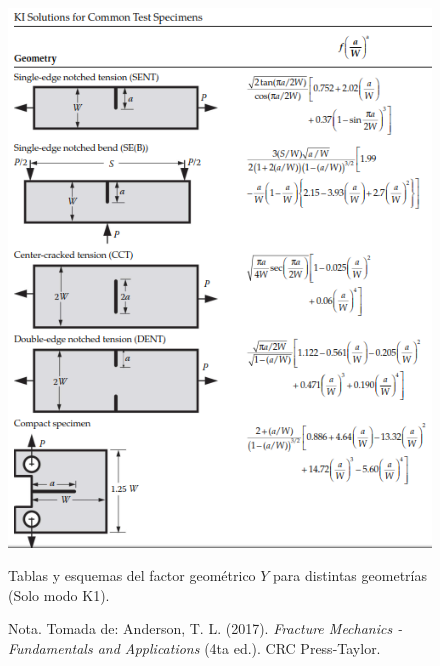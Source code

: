\documentclass[12pt,letterpaper]{article}
\begin{document}
\begin{figure}[H]
    \centering
    \includegraphics[width=0.85\linewidth]{d.png} %
    \caption{Tablas y esquemas del factor geométrico $Y$ para distintas geometrías (Solo modo K1).}
    \label{fig:factor_intensidad_Y2}
    \caption*{Nota. Tomada de: Anderson, T. L. (2017). \textit{Fracture Mechanics - Fundamentals and Applications} (4ta ed.). CRC Press-Taylor.}\cite{anderson2017fracture}
\end{figure}


\newpage
\printbibliography[title=Referencias]
\nocite{*} %
\end{document}
